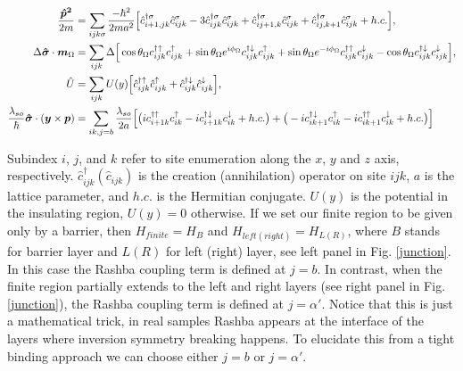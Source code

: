 \documentclass[10pt,prb,showpacs,amssymb,floatfix]{revtex4-1}
\newcommand{\dna}{\downarrow}
\newcommand{\nn}{\nonumber}
\newcommand{\upa}{\uparrow}
\newcommand{\alp}{\alpha}
\newcommand{\Dlt}{\Delta}
\newcommand{\lam}{\lambda}
\newcommand{\Og}{\Omega}
\newcommand{\sg}{\sigma}
\newcommand{\h}{\hat}
\begin{document}
\begin{align}
\label{eq:potential2nd1}
\frac{\bm{\h p^2}}{2m} &= \sum_{ijk\sg}  \frac{-\hbar^2}{2ma^2} \Big{[} \hat{c}_{i+1,jk}^{\dagger \sigma} \hat{c}^\sigma_{ijk} - 3\hat{c}_{ijk}^{\dagger \sigma} \hat{c}^\sigma_{ijk} + \hat{c}_{ij+1,k}^{\dagger \sigma} \hat{c}^\sigma_{ijk} + \hat{c}_{ij,k+1}^{\dagger \sigma} \hat{c}^\sigma_{ijk} + h.c.   \Big{]}, \\
 \Dlt \bm{\h \sg}\cdot \bm m_\Og &= \sum_{ijk} \Dlt \Big{[} \cos\theta_\Og c_{ijk}^{\dagger \uparrow} c_{ijk}^\uparrow +  \sin\theta_\Og e^{i\phi_\Og} c_{ijk}^{\dagger \downarrow} c_{ijk}^\uparrow+  \sin\theta_\Og e^{-i\phi_\Og} c_{ijk}^{\dagger \uparrow} c_{ijk}^\downarrow - \cos\theta_\Og  c_{ijk}^{\dagger \downarrow} c_{ijk}^\downarrow  \Big{]}, \label{eq:potential2nd2}\\
\h U &= \sum_{ijk} U(y) \Big{[}  \hat{c}_{ijk}^{\dagger \upa} \hat{c}^{\upa}_{ijk} +   \hat{c}_{ijk}^{\dagger \dna} \hat{c}^{\dna}_{ijk} \Big{]}, \nn\\
\frac{\lam_{so}}{\hbar} \bm{\h \sg} \cdot (\bm y \times \bm p) &= \sum_{ik, j = b} \frac{\lambda_{so}}{2a} \Big{[} \big{(}i c_{i+1k}^{\dagger \uparrow} c_{ik}^\uparrow  - i c_{i+1k}^{\dagger \downarrow} c_{ik}^\downarrow + h.c. \big{)} +  \big{(} -i c_{ik+1}^{\dagger \downarrow}  c_{ik}^\uparrow  - i c_{ik+1}^{\dagger \uparrow}  c_{ik}^\downarrow + h.c. \big{)}  \Big{]}
\label{eq:potential2nd}
\end{align}

Subindex $i$, $j$, and $k$ refer to site enumeration along the $x$, $y$ and $z$ axis, respectively. $\h c_{ijk}^\dagger (\h c_{ijk})$ is the creation (annihilation) operator on site $ijk$, $a$ is the lattice parameter, and $h.c.$ is the Hermitian conjugate. $U(y)$ is the potential in the insulating region, $U(y)=0$ otherwise.  If we set our finite region to be given only by a barrier, then $H_{finite}= H_{B}$ and $H_{left(right)}=H_{L(R)}$, where $B$ stands for barrier layer and $L (R)$ for left (right) layer, see left panel in Fig. \ref{junction}. In this case the Rashba coupling term is defined at $j=b$. In contrast, when the finite region partially extends to the left and right layers (see right panel in Fig. \ref{junction}), the Rashba coupling term is defined at $j=\alp'$. Notice that this is just a mathematical trick, in real samples Rashba appears at the interface of the layers where inversion symmetry breaking happens. To elucidate this from a tight binding approach we can choose either $j=b$ or $j=\alp'$.  
\end{document}
